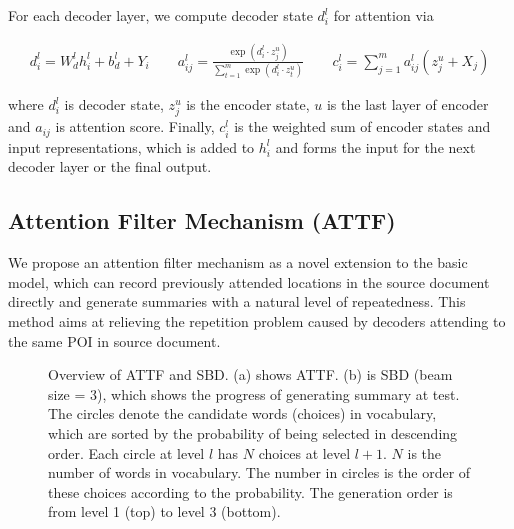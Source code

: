 For each decoder layer,
we compute decoder state $d_{i}^{l}$ for attention via
\begin{small}
\begin{align}
\label{eq:a}
    d _ { i } ^ { l } = W _ { d } ^ { l } h _ { i } ^ { l } + b _ { d } ^ { l } + Y _ { i } \quad \quad
    a _ { i j } ^ { l } = \frac { \exp \left( d _ { i } ^ { l } \cdot z _ { j } ^ { u } \right) } { \sum _ { t = 1 } ^ { m } \exp \left( d _ { i } ^ { l } \cdot z _ { t } ^ { u } \right) } \quad \quad
    c _ { i } ^ { l } = \sum _ { j = 1 } ^ { m } a _ { i j } ^ { l } \left( z _ { j } ^ { u } + X_j \right) 
\end{align}
\end{small}
where $d_{i}^{l}$ is decoder state, $z_{j}^{u}$ is the encoder state, 
$u$ is the last layer of encoder
and $a_{ij}$ is attention score.
Finally, $c _ { i } ^ { l }$ 
is the weighted sum of encoder states and input representations,
which is added to $h_{i}^{l}$ and forms the input for the next decoder layer or the final output.


\subsection{Attention Filter Mechanism (ATTF)}
\label{sec:attf}
We propose an attention filter mechanism as a novel extension 
to the basic model,
which can record previously attended locations 
in the source document directly and generate summaries 
with a natural level of repeatedness. 
This method aims at relieving the repetition problem caused by 
decoders attending to the same POI in source document.

\begin{figure}[th!]
\centering
{}
\quad
{}
\caption{Overview of ATTF and SBD. (a) shows ATTF.
	    (b) is SBD (beam size = 3), which shows the progress of generating summary at test. The circles denote the
		candidate words (choices) in vocabulary, 
		which are sorted by the probability of being selected in
		descending order. Each circle at level $l$ has $N$ choices 
		at level $l+1$. $N$ is the number of words in vocabulary. 
		The number in circles is the order of these choices according to the
		probability. The generation order is from level 1 (top) to level 3 (bottom).}
\label{fig:model_main}
\end{figure}

